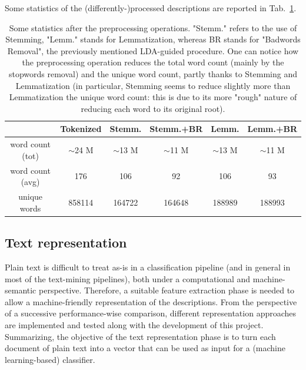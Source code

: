 \documentclass[10pt]{article}
\begin{document}
Some statistics of the (differently-)processed descriptions are reported in Tab.~\ref{tab:preprocessing}.

\begin{table}[]
\centering
\begin{tabular}{cccccc}
\hline
\multicolumn{1}{l}{} & Tokenized & Stemm.   & Stemm.+BR & Lemm.    & Lemm.+BR \\ \hline
word count (tot)     &  $\sim$24 M  & $\sim$13 M & $\sim$11 M  & $\sim$13 M & $\sim$11 M \\
word count (avg)     & 176       & 106      & 92        & 106      & 93       \\
unique words         & 858114    & 164722   & 164648    & 188989   & 188993   \\ \hline
\end{tabular}

\caption{Some statistics after the preprocessing operations. "Stemm." refers to the use of Stemming, "Lemm." stands for Lemmatization, whereas BR stands for "Badwords Removal", the previously mentioned LDA-guided procedure. One can notice how the preprocessing operation reduces the total word count (mainly by the stopwords removal) and the unique word count, partly thanks to Stemming and Lemmatization (in particular, Stemming seems to reduce slightly more than Lemmatization the unique word count: this is due to its more "rough" nature of reducing each word to its original root).}
\label{tab:preprocessing}
\end{table}




\subsection{Text representation \label{subsec:text-prepresentation}}

Plain text is difficult to treat as-is in a classification pipeline (and in general in most of the text-mining pipelines), both under a computational and machine-semantic perspective. 
Therefore, a suitable feature extraction phase is needed to allow a machine-friendly representation of the descriptions. From the perspective of a successive performance-wise comparison, different representation approaches are implemented and tested along with the development of this project. 
Summarizing, the objective of the text representation phase is to turn each document of plain text into a vector that can be used as input for a (machine learning-based) classifier.
\end{document}
